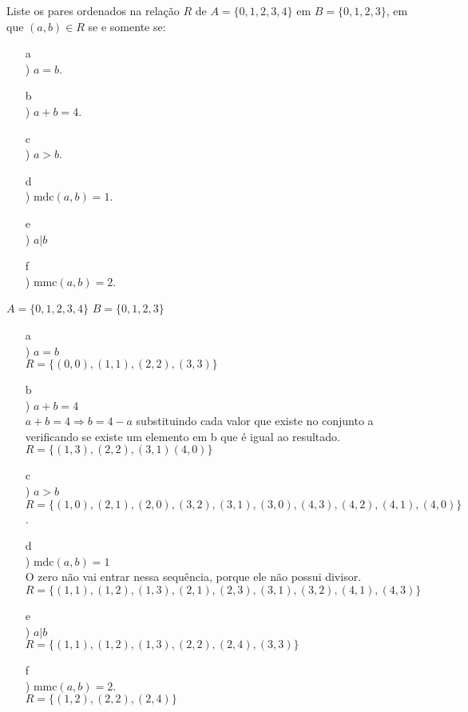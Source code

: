 \documentclass{minimal}
\begin{document}
Liste os pares ordenados na relação $R$ de $A = \{0, 1, 2, 3, 4\}$ em $B = \{0, 1, 2, 3\}$, em que $(a, b) \in R$ se e somente se:

\begin{enumerate}
    \item[a\\)] $a = b$.
    \item[b\\)] $a + b = 4$.
    \item[c\\)] $a > b$.
    \item[d\\)] $\text{mdc}(a, b) = 1$.
    \item[e\\)] $a | b$
    \item[f\\)] $\text{mmc}(a, b) = 2$.
\end{enumerate} 
\vspace{20pt}
$A = \{0, 1, 2, 3, 4\}$  $B = \{0, 1, 2, 3\}$
\begin{enumerate}
    \item[a\\)] $a = b$ \\ 
    $R = \{(0,0), (1,1), (2, 2), (3, 3)\}$
    \item[b\\)] $a + b = 4$ \\
    $a + b = 4 \Rightarrow b = 4 - a$
    substituindo cada valor que existe no conjunto a 
    verificando se existe um elemento em b que é igual
    ao resultado. \\ $R = \{(1, 3), (2, 2), (3, 1) (4, 0)\}$
    \item[c\\)] $a > b$ \\ 
    $R = \{(1,0), (2, 1), (2, 0), (3, 2), (3, 1), (3,0), (4, 3), (4, 2), (4, 1), (4, 0) \}$.
    \item[d\\)] $\text{mdc}(a, b) = 1$ \\
    O zero não vai entrar 
    nessa sequência, porque ele não possui divisor.\\
    $R = \{(1,1), (1,2), (1,3), (2, 1), (2, 3), (3, 1), 
    (3, 2) , (4, 1), (4, 3)\}$
    \item[e\\)] $a | b$ \\
    $R = \{(1,1), (1, 2), (1, 3), (2, 2), (2, 4), (3, 3)\}$
    \item[f\\)] $\text{mmc}(a, b) = 2$. \\
    $R = \{(1, 2), (2, 2), (2, 4)\}$
\end{enumerate}
\end{document}
